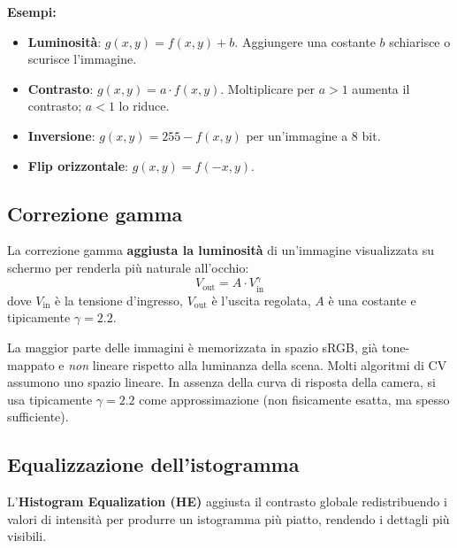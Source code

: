 \documentclass[12pt, a4paper]{report}
\begin{document}
\textbf{Esempi:}
\begin{itemize}
  \item \textbf{Luminosità}: $g(x,y)=f(x,y)+b$.
        Aggiungere una costante $b$ schiarisce o scurisce l'immagine.
  \item \textbf{Contrasto}: $g(x,y)=a\cdot f(x,y)$.
        Moltiplicare per $a>1$ aumenta il contrasto; $a<1$ lo riduce.
  \item \textbf{Inversione}: $g(x,y)=255-f(x,y)$ per un'immagine a 8 bit.
  \item \textbf{Flip orizzontale}: $g(x,y)=f(-x,y)$.
\end{itemize}

\subsection{Correzione gamma}

La correzione gamma \textbf{aggiusta la luminosità} di un'immagine visualizzata su
schermo per renderla più naturale all'occhio:
\[
  V_{\text{out}} = A \cdot V_{\text{in}}^{\gamma}
\]
dove $V_{\text{in}}$ è la tensione d'ingresso, $V_{\text{out}}$ è l'uscita
regolata, $A$ è una costante e tipicamente $\gamma = 2.2$.

\begin{notebox}
La maggior parte delle immagini è memorizzata in spazio sRGB, già tone-mappato e
\emph{non} lineare rispetto alla luminanza della scena.  Molti algoritmi di CV
assumono uno spazio lineare.  In assenza della curva di risposta della camera, si
usa tipicamente $\gamma=2.2$ come approssimazione (non fisicamente esatta, ma spesso
sufficiente).
\end{notebox}

\subsection{Equalizzazione dell'istogramma}

L'\textbf{Histogram Equalization (HE)} aggiusta il contrasto globale redistribuendo
i valori di intensità per produrre un istogramma più piatto, rendendo i dettagli più
visibili.
\end{document}
